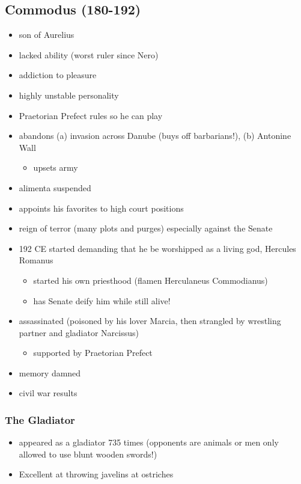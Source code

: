 \documentclass[12pt, twoside]{article}
\begin{document}
\subsection{Commodus (180-192)}
\begin{itemize}
\item son of Aurelius
\item lacked ability (worst ruler since Nero)
\item addiction to pleasure 
\item highly unstable personality
\item Praetorian Prefect rules so he can play
\item abandons (a) invasion across Danube (buys off barbarians!), (b) Antonine Wall
	\begin{itemize}
	\item upsets army
	\end{itemize}
\item alimenta suspended
\item appoints his favorites to high court positions
\item reign of terror (many plots and purges) especially against the Senate
\item 192 CE started demanding that he be worshipped as a living god, Hercules Romanus
	\begin{itemize}
	\item started his own priesthood (flamen Herculaneus Commodianus)
	\item has Senate deify him while still alive!
	\end{itemize}
\item assassinated (poisoned by his lover Marcia, then strangled by wrestling partner and gladiator Narcissus) 
	\begin{itemize}
	\item supported by Praetorian Prefect
	\end{itemize}
\item memory damned
\item civil war results
\end{itemize}

\subsubsection{The Gladiator}
\begin{itemize}
\item appeared as a gladiator 735 times (opponents are animals or men only allowed to use blunt wooden swords!)
\item Excellent at throwing javelins at ostriches 
\end{itemize}
\end{document}
